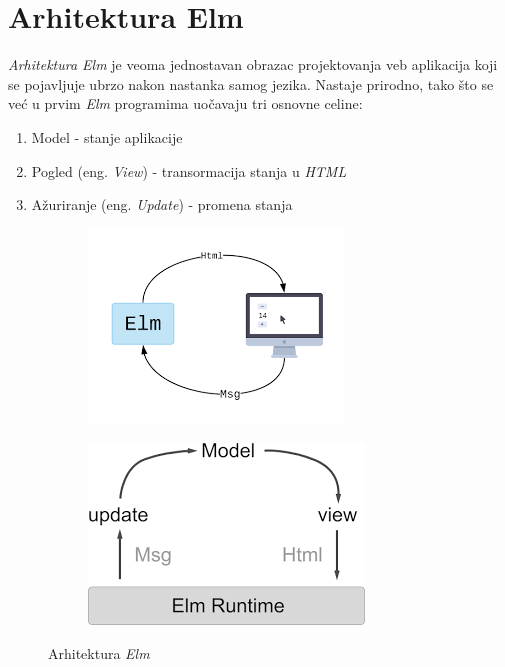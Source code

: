 \documentclass[12pt,oneside]{memoir}
\begin{document}
\section{Arhitektura Elm}
\emph{Arhitektura Elm} je veoma jednostavan obrazac projektovanja veb aplikacija koji se pojavljuje
ubrzo nakon nastanka samog jezika. Nastaje prirodno, tako što se već u prvim \emph{Elm} programima
uočavaju tri osnovne celine:
\begin{enumerate}
  \item Model - stanje aplikacije
  \item Pogled (eng. \emph{View}) - transormacija stanja u \emph{HTML}
  \item Ažuriranje (eng. \emph{Update}) - promena stanja
\end{enumerate}
\begin{figure}[!ht]
\centering
\begin{subfigure}{.5\textwidth}
  \centering
  \includegraphics[width=.8\linewidth]{elm-arch-site}
\end{subfigure}%
\begin{subfigure}{.5\textwidth}
  \centering
  \includegraphics[width=.7\linewidth]{elm-arch-book}
\end{subfigure}
\caption{Arhitektura \emph{Elm}}
\label{fig:elm-arh}
\end{figure}
\end{document}
